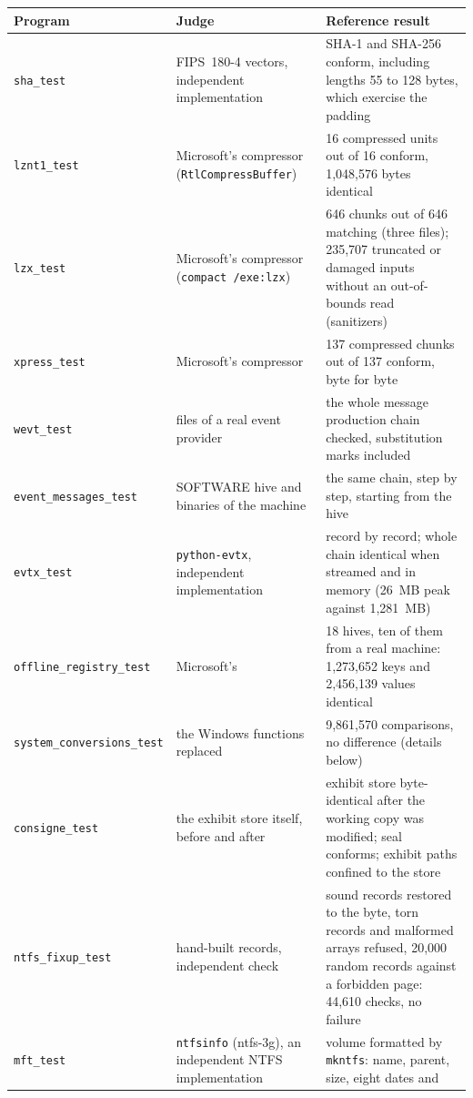 \documentclass[11pt,a4paper,oneside]{report}
\begin{document}
\begin{longtable}{@{}L{4.6cm}L{3.8cm}L{6.6cm}@{}}
\toprule
\textbf{Program} & \textbf{Judge} & \textbf{Reference result} \\
\midrule
\endhead
\texttt{sha\_test} & FIPS~180-4 vectors, independent implementation &
  SHA-1 and SHA-256 conform, including lengths 55 to 128 bytes, which exercise
  the padding \\
\texttt{lznt1\_test} & Microsoft's compressor (\texttt{RtlCompressBuffer}) &
  16 compressed units out of 16 conform, 1,048,576 bytes identical \\
\texttt{lzx\_test} & Microsoft's compressor (\texttt{compact /exe:lzx}) &
  646 chunks out of 646 matching (three files); 235,707 truncated or damaged
  inputs without an out-of-bounds read (sanitizers) \\
\texttt{xpress\_test} & Microsoft's compressor &
  137 compressed chunks out of 137 conform, byte for byte \\
\texttt{wevt\_test} & files of a real event provider &
  the whole message production chain checked, substitution marks included \\
\texttt{event\_messages\_test} & SOFTWARE hive and binaries of the machine &
  the same chain, step by step, starting from the hive \\
\texttt{evtx\_test} & \texttt{python-evtx}, independent implementation &
  record by record; whole chain identical when streamed and in memory (26~MB
  peak against 1,281~MB) \\
\texttt{offline\_registry\_test} & Microsoft's  &
  18 hives, ten of them from a real machine: 1,273,652 keys and 2,456,139
  values identical \\
\texttt{system\_conversions\_test} & the Windows functions replaced &
  9,861,570 comparisons, no difference (details below) \\
\texttt{consigne\_test} & the exhibit store itself, before and after &
  exhibit store byte-identical after the working copy was modified; seal
  conforms; exhibit paths confined to the store \\
\texttt{ntfs\_fixup\_test} & hand-built records, independent check &
  sound records restored to the byte, torn records and malformed arrays
  refused, 20,000 random records against a forbidden page: 44,610 checks, no
  failure \\
\texttt{mft\_test} & \texttt{ntfsinfo} (ntfs-3g), an independent NTFS implementation &
  volume formatted by \texttt{mkntfs}: name, parent, size, eight dates and

\end{longtable}
\end{document}

